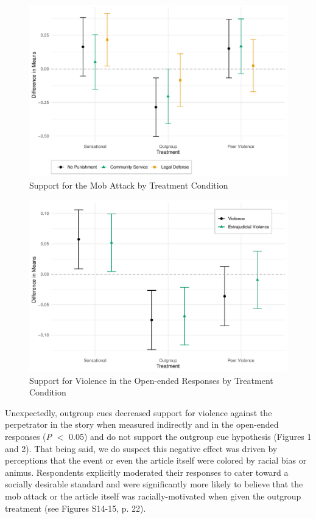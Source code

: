 \begin{figure}[!htbp]
  \centering
  \caption{Support for the Mob Attack by Treatment Condition}
  \includegraphics[width=.835\textwidth]{figures/ATE_punish_mob_outcomes.pdf}
\end{figure}

\begin{figure}[!htbp]
  \centering
  \caption{Support for Violence in the Open-ended Responses by Treatment Condition}
  \includegraphics[width=.835\textwidth]{figures/ATE_oe.pdf}
\end{figure}

Unexpectedly, outgroup cues decreased support for violence against the perpetrator in the story when measured indirectly and in the open-ended responses (\textit{P} $<$ 0.05) and do not support the outgroup cue hypothesis (Figures 1 and 2). That being said, we do suspect this negative effect was driven by perceptions that the event or even the article itself were colored by racial bias or animus. Respondents explicitly moderated their responses to cater toward a socially desirable standard and were significantly more likely to believe that the mob attack or the article itself was racially-motivated when given the outgroup treatment (see Figures S14-15, p. 22).

